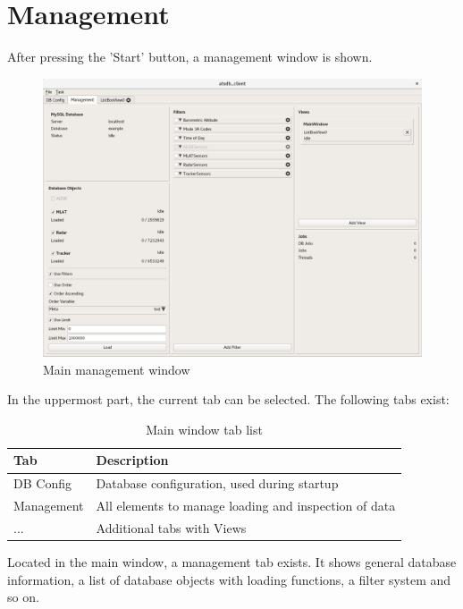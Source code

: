 \section{Management}
\label{sec:management}

After pressing the 'Start' button, a management window is shown.

\begin{figure}[H]
  \hspace*{-2cm}
    \includegraphics[width=18cm,frame]{../screenshots/management.png}
  \caption{Main management window}
  \label{fig:management}
\end{figure}

In the uppermost part, the current tab can be selected. The following tabs exist:

\begin{table}[h]
  \center
  \begin{tabular}{ | l | l |}
    \hline
    \textbf{Tab} & \textbf{Description} \\ \hline
    DB Config & Database configuration, used during startup \\ \hline
    Management & All elements to manage loading and inspection of data \\ \hline
    ... & Additional tabs with Views \\
    \hline
  \end{tabular}
  \caption{Main window tab list}
\end{table}

Located in the main window, a management tab exists.  It shows general database information, a list of database objects with loading functions, a filter system and so on.

